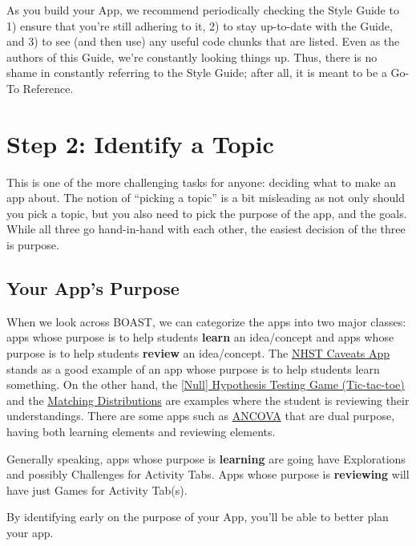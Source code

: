 \documentclass[
]{book}
\begin{document}
As you build your App, we recommend periodically checking the Style Guide to 1) ensure that you're still adhering to it, 2) to stay up-to-date with the Guide, and 3) to see (and then use) any useful code chunks that are listed. Even as the authors of this Guide, we're constantly looking things up. Thus, there is no shame in constantly referring to the Style Guide; after all, it is meant to be a Go-To Reference.

\hypertarget{step2}{%
\section{Step 2: Identify a Topic}\label{step2}}

This is one of the more challenging tasks for anyone: deciding what to make an app about. The notion of ``picking a topic'' is a bit misleading as not only should you pick a topic, but you also need to pick the purpose of the app, and the goals. While all three go hand-in-hand with each other, the easiest decision of the three is purpose.

\hypertarget{step2a}{%
\subsection{Your App's Purpose}\label{step2a}}

When we look across BOAST, we can categorize the apps into two major classes: apps whose purpose is to help students \textbf{learn} an idea/concept and apps whose purpose is to help students \textbf{review} an idea/concept. The \href{https://psu-eberly.shinyapps.io/Significance_Testing_Caveats/}{NHST Caveats App} stands as a good example of an app whose purpose is to help students learn something. On the other hand, the \href{https://psu-eberly.shinyapps.io/Hypothesis_Testing_Game/}{{[}Null{]} Hypothesis Testing Game (Tic-tac-toe)} and the \href{https://psu-eberly.shinyapps.io/Matching_Distributions/}{Matching Distributions} are examples where the student is reviewing their understandings. There are some apps such as \href{https://psu-eberly.shinyapps.io/ANCOVA/}{ANCOVA} that are dual purpose, having both learning elements and reviewing elements.

Generally speaking, apps whose purpose is \textbf{learning} are going have Explorations and possibly Challenges for Activity Tabs. Apps whose purpose is \textbf{reviewing} will have just Games for Activity Tab(s).

By identifying early on the purpose of your App, you'll be able to better plan your app.
\end{document}
